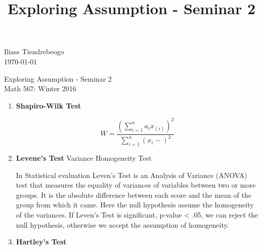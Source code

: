 \documentclass{article}[12pt]
\begin{document}
\begin{center}


\title{Exploring Assumption - Seminar 2}
\hfill Iliass Tiendrebeogo\\

\hfill \today\\
\end{center}
\bigskip

\begin{center}
  \begin{Large}
      
    Exploring Assumption - Seminar 2 \\
    Math 567: Winter 2016 \\
       
  \end{Large}
\end{center}

\bigskip
\begin{enumerate}
\item %
{\bf Shapiro-Wilk Test}

$$ W = \frac{(\sum_{i=1}^{n} a_i x_{(i)} )^2}{\sum_{i=1}^{n} (x_i - )^2 } $$


\item %
{ \bf Levene's Test} Variance Homogeneity Test

In Statistical evaluation Leven's Test is an Analysis of Variance (ANOVA) test that measures the equality of variances of variables between two or more groups. It is the absolute difference between each score and the mean of the group from which it came. Here the null hypothesis assume the homogeneity of the variances. If Leven's Test is significant, p-value < .05, we can reject the null hypothesis, otherwise we accept the assumption of homogeneity.

\item %
{\bf Hartley's Test}
\end{enumerate}
\end{document}

